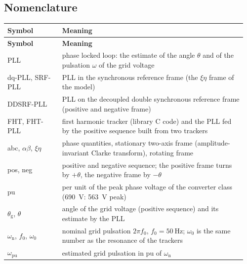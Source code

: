 \documentclass[11pt,a4paper]{scrartcl}
\newcommand{\ped}[1]{_{\mathrm{#1}}}
\begin{document}


\tableofcontents
\listoffigures
\listoftables
\newpage

\begin{onehalfspace}

\section*{Nomenclature}
\label{sec:nomenclature}

\begingroup
{}
\begin{longtable}{@{} >{\raggedright\arraybackslash}p{0.22\linewidth} p{0.74\linewidth} @{}}
	\toprule
	\textbf{Symbol} & \textbf{Meaning} \\
	\midrule
	\endfirsthead
	\toprule
	\textbf{Symbol} & \textbf{Meaning} \\
	\midrule
	\endhead
	\bottomrule
	\endfoot
	\bottomrule
	\endlastfoot
	PLL & phase locked loop: the estimate of the angle $\theta$ and of the pulsation $\omega$ of the grid voltage \\
	dq-PLL, SRF-PLL & PLL in the synchronous reference frame (the $\xi\eta$ frame of the model) \\
	DDSRF-PLL & PLL on the decoupled double synchronous reference frame (positive and negative frame) \\
	FHT, FHT-PLL & first harmonic tracker (library C code) and the PLL fed by the positive sequence built from two trackers \\
	abc, $\alpha\beta$, $\xi\eta$ & phase quantities, stationary two-axis frame (amplitude-invariant Clarke transform), rotating frame \\
	pos, neg & positive and negative sequence; the positive frame turns by $+\theta$, the negative frame by $-\theta$ \\
	pu & per unit of the peak phase voltage of the converter class (\SI{690}{\volt}: \SI{563}{\volt} peak) \\
	$\theta\ped{g}$, $\theta$ & angle of the grid voltage (positive sequence) and its estimate by the PLL \\
	$\omega\ped{n}$, $f\ped{0}$, $\omega_0$ & nominal grid pulsation $2\pi f\ped{0}$, $f\ped{0} = \SI{50}{\hertz}$; $\omega_0$ is the same number as the resonance of the trackers \\
	$\omega\ped{pu}$ & estimated grid pulsation in pu of $\omega\ped{n}$ \\

\end{longtable}
\end{onehalfspace}
\end{document}
